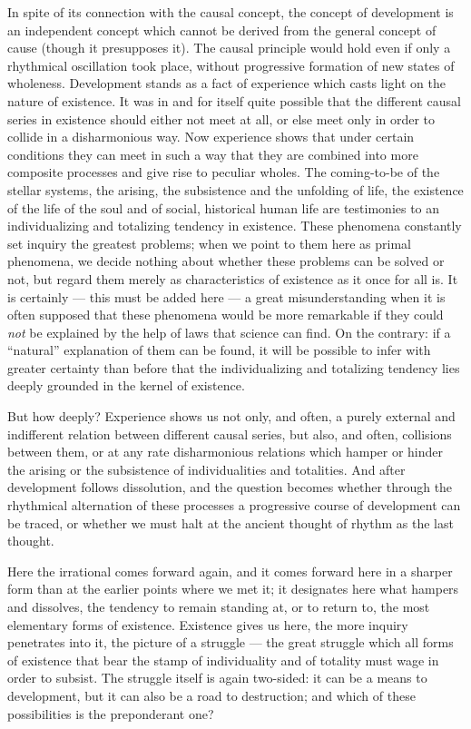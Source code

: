 \documentclass[12pt,a4paper]{book}
\newcommand{\opage}[1]{\marginnote{\footnotesize\textit{[#1]}}}
\begin{document}
In spite of its connection with the causal concept, the concept of development is
an independent concept which cannot be derived from the general concept of cause
(though it presupposes it). The causal principle would hold even if only a
rhythmical oscillation took place, without progressive formation of new states of
wholeness. Development stands as a fact of experience which casts light on the
nature of existence. It was in and for itself quite possible that the different
causal series in existence should either \opage{67}not meet at all, or else meet only in
order to collide in a disharmonious way. Now experience shows that under certain
conditions they can meet in such a way that they are combined into more composite
processes and give rise to peculiar wholes. The coming-to-be of the stellar
systems, the arising, the subsistence and the unfolding of life, the existence of
the life of the soul and of social, historical human life are testimonies to an
individualizing and totalizing tendency in existence. These phenomena constantly
set inquiry the greatest problems; when we point to them here as primal
phenomena, we decide nothing about whether these problems can be solved or not,
but regard them merely as characteristics of existence as it once for all is. It
is certainly --- this must be added here --- a great misunderstanding when it is
often supposed that these phenomena would be more remarkable if they could
\emph{not} be explained by the help of laws that science can find. On the
contrary: if a ``natural'' explanation of them can be found, it will be possible
to infer with greater certainty than before that the individualizing and
totalizing tendency lies deeply grounded in the kernel of existence.

But how deeply? Experience shows us not only, and often, a purely external and
indifferent relation between different causal series, but also, and often,
collisions between them, or at any rate disharmonious relations which hamper or
hinder the arising or the subsistence of individualities and totalities. And
after development follows dissolution, and the question becomes whether through
the rhythmical alternation of these processes a progressive course of development
can be traced, or whether we must halt at the ancient thought of rhythm as the
last thought.

Here the irrational comes forward again, and it comes forward here in a sharper
form than at the earlier points where we met it; it designates here what hampers
and dissolves, the tendency to remain standing at, or to return to, the most
elementary forms of existence. Existence gives us here, the more inquiry
penetrates into it, the picture of a struggle --- the great struggle which all
forms of existence that bear the stamp of individuality and of totality must wage
in order to subsist. The struggle itself is again \opage{68}two-sided: it can be a means to
development, but it can also be a road to destruction; and which of these
possibilities is the preponderant one?
\end{document}
